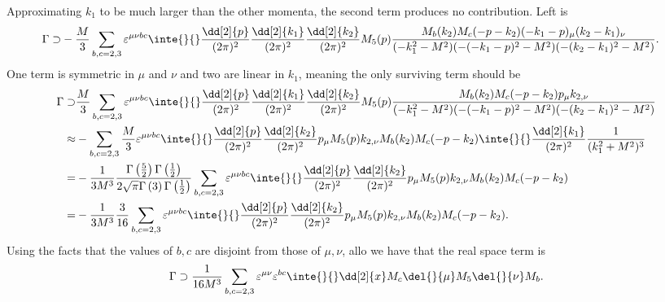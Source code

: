 Approximating $k_{1}$ to be much larger than the other momenta, the second term produces no contribution. Left is
\begin{align*}
	\Gamma \supset& -\frac{M}{3}\sum\limits_{b, c = 2, 3}\varepsilon^{\mu\nu bc}\inte{}{}\frac{\dd[2]{p}}{(2\pi)^{2}}\frac{\dd[2]{k_{1}}}{(2\pi)^{2}}\frac{\dd[2]{k_{2}}}{(2\pi)^{2}}M_{5}(p)\frac{M_{b}(k_{2})M_{c}(-p - k_{2})(-k_{1} - p)_{\mu}(k_{2} - k_{1})_{\nu}}{(-k_{1}^{2} - M^{2})(-(-k_{1} - p)^{2} - M^{2})(-(k_{2} - k_{1})^{2} - M^{2})}.
\end{align*}
One term is symmetric in $\mu$ and $\nu$ and two are linear in $k_{1}$, meaning the only surviving term should be
\begin{align*}
	\Gamma \supset& \frac{M}{3}\sum\limits_{b, c = 2, 3}\varepsilon^{\mu\nu bc}\inte{}{}\frac{\dd[2]{p}}{(2\pi)^{2}}\frac{\dd[2]{k_{1}}}{(2\pi)^{2}}\frac{\dd[2]{k_{2}}}{(2\pi)^{2}}M_{5}(p)\frac{M_{b}(k_{2})M_{c}(-p - k_{2})p_{\mu}k_{2, \nu}}{(-k_{1}^{2} - M^{2})(-(-k_{1} - p)^{2} - M^{2})(-(k_{2} - k_{1})^{2} - M^{2})} \\
	       \approx& -\sum\limits_{b, c = 2, 3}\frac{M}{3}\varepsilon^{\mu\nu bc}\inte{}{}\frac{\dd[2]{p}}{(2\pi)^{2}}\frac{\dd[2]{k_{2}}}{(2\pi)^{2}}p_{\mu}M_{5}(p)k_{2, \nu}M_{b}(k_{2})M_{c}(-p - k_{2})\inte{}{}\frac{\dd[2]{k_{1}}}{(2\pi)^{2}}\frac{1}{(k_{1}^{2} + M^{2})^{3}} \\
	             =& -\frac{1}{3M^{3}}\frac{\Gamma\left(\frac{5}{2}\right)\Gamma\left(\frac{1}{2}\right)}{2\sqrt{\pi}\Gamma\left(3\right)\Gamma\left(\frac{1}{2}\right)}\sum\limits_{b, c = 2, 3}\varepsilon^{\mu\nu bc}\inte{}{}\frac{\dd[2]{p}}{(2\pi)^{2}}\frac{\dd[2]{k_{2}}}{(2\pi)^{2}}p_{\mu}M_{5}(p)k_{2, \nu}M_{b}(k_{2})M_{c}(-p - k_{2}) \\
	             =& -\frac{1}{3M^{3}}\frac{3}{16}\sum\limits_{b, c = 2, 3}\varepsilon^{\mu\nu bc}\inte{}{}\frac{\dd[2]{p}}{(2\pi)^{2}}\frac{\dd[2]{k_{2}}}{(2\pi)^{2}}p_{\mu}M_{5}(p)k_{2, \nu}M_{b}(k_{2})M_{c}(-p - k_{2}).
\end{align*}
Using the facts that the values of $b, c$ are disjoint from those of $\mu, \nu$, allo we have that the real space term is
\begin{align*}
	\Gamma \supset \frac{1}{16M^{3}}\sum\limits_{b, c = 2, 3}\varepsilon^{\mu\nu}\varepsilon^{bc}\inte{}{}\dd[2]{x}M_{c}\del{}{\mu}M_{5}\del{}{\nu}M_{b}.
\end{align*}

